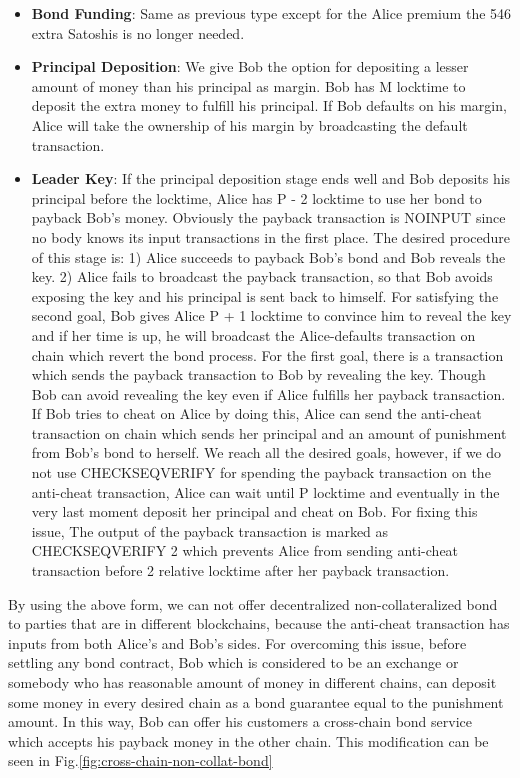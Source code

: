 \begin{itemize}
    \item \textbf{Bond Funding}: Same as previous type except for the Alice premium the 546 extra Satoshis is no longer needed.
    
    \item \textbf{Principal Deposition}: We give Bob the option for depositing a lesser amount of money than his principal as margin. Bob has M locktime to deposit the extra money to fulfill his principal. If Bob defaults on his margin, Alice will take the ownership of his margin by broadcasting the default transaction.
    
    \item \textbf{Leader Key}: If the principal deposition stage ends well and Bob deposits his principal before the locktime, Alice has P - 2 locktime to use her bond to payback Bob's money. Obviously the payback transaction is NOINPUT since no body knows its input transactions in the first place. The desired procedure of this stage is: 1) Alice succeeds to payback Bob's bond and Bob reveals the \keyone key. 2) Alice fails to broadcast the payback transaction, so that Bob avoids exposing the \keyone key and his principal is sent back to himself. For satisfying the second goal, Bob gives Alice P + 1 locktime to convince him to reveal the \keyone key and if her time is up, he will broadcast the Alice-defaults transaction on chain which revert the bond process. For the first goal, there is a transaction which sends the payback transaction to Bob by revealing the \keyone key. Though Bob can avoid revealing the \keyone key even if Alice fulfills her payback transaction. If Bob tries to cheat on Alice by doing this, Alice can send the anti-cheat transaction on chain which sends her principal and an amount of punishment from Bob's bond to herself. We reach all the desired goals, however, if we do not use CHECKSEQVERIFY for spending the payback transaction on the anti-cheat transaction, Alice can wait until P locktime and eventually in the very last moment deposit her principal and cheat on Bob. For fixing this issue, The output of the payback transaction is marked as CHECKSEQVERIFY 2 which prevents Alice from sending anti-cheat transaction before 2 relative locktime after her payback transaction.
     
\end{itemize}


By using the above form, we can not offer decentralized non-collateralized bond to parties that are in different blockchains, because the anti-cheat transaction has inputs from both Alice's and Bob's sides. For overcoming this issue, before settling any bond contract, Bob which is considered to be an exchange or somebody who has reasonable amount of money in different chains, can deposit some money in every desired chain as a bond guarantee equal to the punishment amount. In this way, Bob can offer his customers a cross-chain bond service which accepts his payback money in the other chain. This modification can be seen in Fig.\ref{fig:cross-chain-non-collat-bond}


